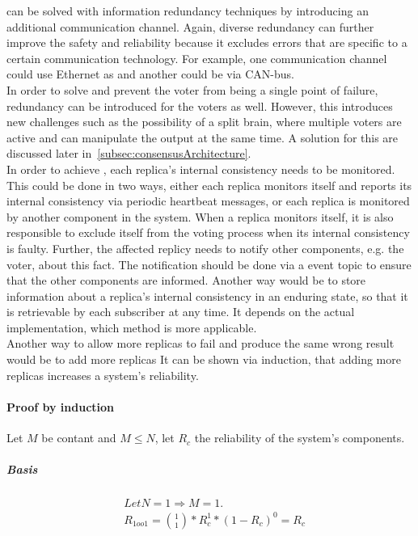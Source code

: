 \ChallengeComm can be solved with information redundancy techniques by introducing an additional communication channel.
Again, diverse redundancy can further improve the safety and reliability because it excludes errors that are specific to a certain communication technology.
For example, one communication channel could use Ethernet as and another could be via CAN-bus.
\\

In order to solve \ChallengeVoter and prevent the voter from being a single point of failure, redundancy can be introduced for the voters as well.
However, this introduces new challenges such as the possibility of a split brain, where multiple voters are active and can manipulate the output at the same time.
A solution for this are discussed later in~\autoref{subsec:consensusArchitecture}.
\\

In order to achieve \ChallengeWR, each replica's internal consistency needs to be monitored.
This could be done in two ways, either each replica monitors itself and reports its internal consistency via periodic heartbeat messages, or each replica is monitored by another component in the system.
When a replica monitors itself, it is also responsible to exclude itself from the voting process when its internal consistency is faulty.
Further, the affected replicy needs to notify other components, e.g. the voter, about this fact.
The notification should be done via a  event topic to ensure that the other components are informed.
Another way would be to store information about a replica's internal consistency in an enduring  state, so that it is retrievable by each subscriber at any time.
It depends on the actual implementation, which method is more applicable.
\\

Another way to allow more replicas to fail and produce the same wrong result would be to add more replicas
It can be shown via induction, that adding more replicas increases a system's reliability.

\paragraph{Proof by induction}
Let $M$ be contant and $M \leq N$, let $R_{c}$ the reliability of the system's components.

\subparagraph{Basis}
\begin{align*}
&Let N = 1 \Rightarrow M = 1.\\
&R_{1oo1} = {1 \choose 1} * R_{c}^1 * (1 - R_{c})^0 = R_{c}
\end{align*}

